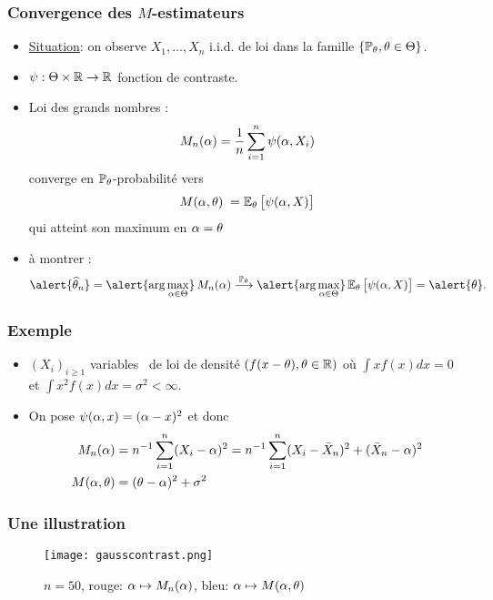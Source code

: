 \begin{frame}
\frametitle{Convergence des $M$-estimateurs}
\begin{itemize}
\item \underline{Situation}: on observe $X_1,\ldots, X_n$ i.i.d. de loi dans la famille $\{\operatorname{{\mathbb P}}_\theta, \theta \in \Theta\}$.
\item $\psi:\Theta \times \operatorname{{\mathbb R}} \rightarrow \operatorname{{\mathbb R}}$ \alert{fonction de contraste}.
\item \alert{Loi des grands nombres :}
$$
M_n(\alpha)=\frac{1}{n}\sum_{i = 1}^n \psi(\alpha,X_i)
$$
converge en $\operatorname{{\mathbb P}}_\theta$-probabilité vers
$$M(\alpha,\theta)\;=\operatorname{{\mathbb E}}_\theta\big[\psi(\alpha,X)\big]$$
\alert{ qui atteint son maximum en $\alpha=\theta$}
\item \og à montrer\fg{} :
$$\alert{\est}= \alert{
\arg \max_{\curtheta \in \Theta}}\, M_n(\curtheta)
\stackrel{\PP_\truetheta}{\longrightarrow} \alert{\arg \max_{\curtheta
\in \Theta}}
\E_\truetheta\big[\psi(\curtheta,X)\big]=\alert{\truetheta}.$$
\end{itemize}
\end{frame}

\begin{frame}
\frametitle{Exemple}
\begin{itemize}
\item $(X_i)_{i \geq 1}$ variables \iid\ de loi de densité $(f(x-\theta), \theta \in \mathbb{R})$ où $\int x f(x) dx=0$ et $\int x^{2} f(x) dx = \sigma^2 < \infty$.
\item On pose $\psi(\alpha,x)= (\alpha-x)^2$ et donc
\begin{align*}
M_n(\alpha)&= n^{-1} \sum_{i=1}^n (X_i - \alpha)^2 = n^{-1} \sum_{i=1}^n (X_i - \bar{X}_n)^2 + (\bar{X}_n - \alpha)^2 \\
M(\alpha,\theta) &= (\theta-\alpha)^2 + \sigma^2   
\end{align*}
\end{itemize}
\end{frame}

\begin{frame}
\frametitle{Une illustration}
\begin{figure}
  \centering
  \texttt{[image: gausscontrast.png]}\\
  \caption{$n=50$, rouge: $\alpha \mapsto M_n(\alpha)$, bleu: $\alpha \mapsto M(\alpha,\theta)$}
\end{figure}
\end{frame}

